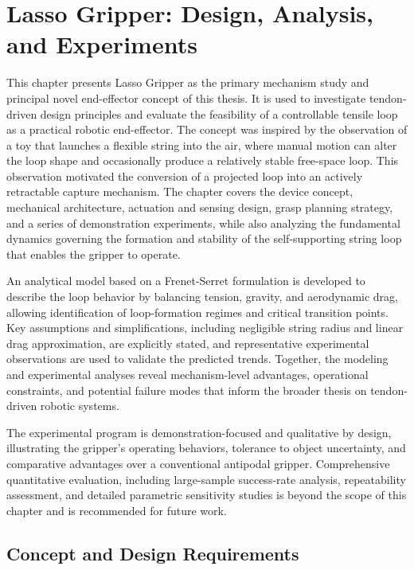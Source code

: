 ﻿%
\chapter{Lasso Gripper: Design, Analysis, and Experiments}

\begin{chaptersummary}
This chapter presents Lasso Gripper as the primary mechanism study and principal novel end-effector concept of this thesis. It is used to investigate tendon-driven design principles and evaluate the feasibility of a controllable tensile loop as a practical robotic end-effector. The concept was inspired by the observation of a toy that launches a flexible string into the air, where manual motion can alter the loop shape and occasionally produce a relatively stable free-space loop. This observation motivated the conversion of a projected loop into an actively retractable capture mechanism. The chapter covers the device concept, mechanical architecture, actuation and sensing design, grasp planning strategy, and a series of demonstration experiments, while also analyzing the fundamental dynamics governing the formation and stability of the self-supporting string loop that enables the gripper to operate.

An analytical model based on a Frenet-Serret formulation is developed to describe the loop behavior by balancing tension, gravity, and aerodynamic drag, allowing identification of loop-formation regimes and critical transition points. Key assumptions and simplifications, including negligible string radius and linear drag approximation, are explicitly stated, and representative experimental observations are used to validate the predicted trends. Together, the modeling and experimental analyses reveal mechanism-level advantages, operational constraints, and potential failure modes that inform the broader thesis on tendon-driven robotic systems.

The experimental program is demonstration-focused and qualitative by design, illustrating the gripper's operating behaviors, tolerance to object uncertainty, and comparative advantages over a conventional antipodal gripper. Comprehensive quantitative evaluation, including large-sample success-rate analysis, repeatability assessment, and detailed parametric sensitivity studies is beyond the scope of this chapter and is recommended for future work.
\end{chaptersummary}
\section{Concept and Design Requirements}

